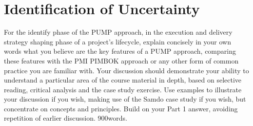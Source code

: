 \section{Identification of Uncertainty}
For the identify phase of the PUMP approach, in the execution and delivery strategy shaping phase of a project’s lifecycle, explain concisely in your own words what you believe are the key features of a PUMP approach, comparing these features with the PMI PIMBOK approach or any other form of common practice you are familiar with. Your discussion should demonstrate your ability to understand a particular area of the course material in depth, based on selective reading, critical analysis and the case study exercise. Use examples to illustrate your discussion if you wish, making use of the Samdo case study if you wish, but concentrate on concepts and principles. Build on your Part 1 answer, avoiding repetition of earlier discussion.
900words.
